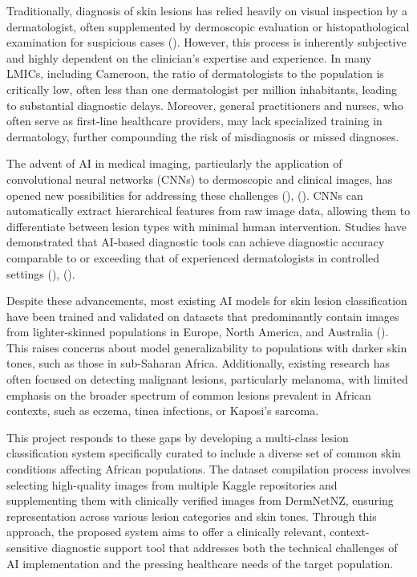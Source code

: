 \documentclass[
  12pt,
  oneside]{article}
\begin{document}
Traditionally, diagnosis of skin lesions has relied heavily on visual
inspection by a dermatologist, often supplemented by dermoscopic
evaluation or histopathological examination for suspicious cases
(). However, this
process is inherently subjective and highly dependent on the clinician's
expertise and experience. In many LMICs, including Cameroon, the ratio
of dermatologists to the population is critically low, often less than
one dermatologist per million inhabitants, leading to substantial
diagnostic delays. Moreover, general practitioners and nurses, who often
serve as first-line healthcare providers, may lack specialized training
in dermatology, further compounding the risk of misdiagnosis or missed
diagnoses.

The advent of AI in medical imaging, particularly the application of
convolutional neural networks (CNNs) to dermoscopic and clinical images,
has opened new possibilities for addressing these challenges
(),
(). CNNs can
automatically extract hierarchical features from raw image data,
allowing them to differentiate between lesion types with minimal human
intervention. Studies have demonstrated that AI-based diagnostic tools
can achieve diagnostic accuracy comparable to or exceeding that of
experienced dermatologists in controlled settings
(),
().

Despite these advancements, most existing AI models for skin lesion
classification have been trained and validated on datasets that
predominantly contain images from lighter-skinned populations in Europe,
North America, and Australia (). This raises concerns about model generalizability to
populations with darker skin tones, such as those in sub-Saharan Africa.
Additionally, existing research has often focused on detecting malignant
lesions, particularly melanoma, with limited emphasis on the broader
spectrum of common lesions prevalent in African contexts, such as
eczema, tinea infections, or Kaposi's sarcoma.

This project responds to these gaps by developing a multi-class lesion
classification system specifically curated to include a diverse set of
common skin conditions affecting African populations. The dataset
compilation process involves selecting high-quality images from multiple
Kaggle repositories and supplementing them with clinically verified
images from DermNetNZ, ensuring representation across various lesion
categories and skin tones. Through this approach, the proposed system
aims to offer a clinically relevant, context-sensitive diagnostic
support tool that addresses both the technical challenges of AI
implementation and the pressing healthcare needs of the target
population.
\end{document}
